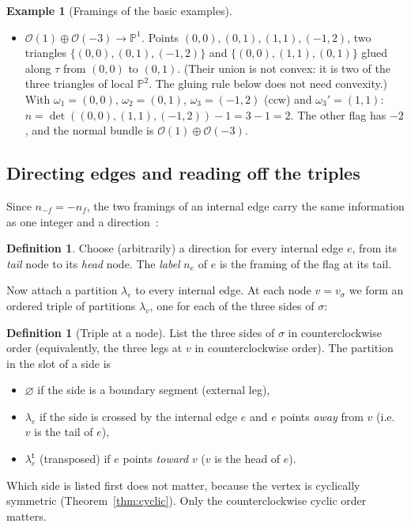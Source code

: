 \documentclass[11pt]{article}
\theoremstyle{plain}
\theoremstyle{definition}
\newtheorem{definition}[theorem]{Definition}
\newtheorem{example}[theorem]{Example}
\theoremstyle{remark}
\newcommand{\PP}{\mathbb{P}}
\newcommand{\es}{\varnothing}
\newcommand{\tr}{{\mathsf t}}
\newcommand{\lt}[1]{#1^{\tr}}
\begin{document}
\begin{example}[Framings of the basic examples]
\begin{itemize}
$\omega_0=0$).
The four framings are therefore $0,\pm1,\pm2,\pm1$: a $(-1,-1)$-curve, two $(0,-2)$-curves and a
$(1,-3)$-curve (these are the exceptional curve $B$, two fibers $F$ and the section $B+F$ of the
Hirzebruch surface $F_1$, see Section~\ref{sec:classes}).
\item \textit{$\mathcal O(1)\oplus\mathcal O(-3)\rightarrow\PP^1$.} Points $(0,0),(0,1),(1,1),(-1,2)$, two
triangles $\{(0,0),(0,1),(-1,2)\}$ and $\{(0,0),(1,1),(0,1)\}$ glued along $\tau$ from $(0,0)$ to
$(0,1)$. (Their union is not convex: it is two of the three triangles of local $\PP^2$. The
gluing rule below does not need convexity.) With $\omega_1=(0,0)$, $\omega_2=(0,1)$,
$\omega_3=(-1,2)$ (ccw) and $\omega_3'=(1,1)$: $n=\det((0,0),(1,1),(-1,2))-1=3-1=2$. The other
flag has $-2$, and the normal bundle is $\mathcal O(1)\oplus\mathcal O(-3)$.
\end{itemize}
\end{example}

\subsection{Directing edges and reading off the triples}\label{ssec:triples}

Since $n_{-f}=-n_f$, the two framings of an internal edge carry the same information as one
integer and a direction~\cite[\S2.1]{Kon}:

\begin{definition}
Choose (arbitrarily) a direction for every internal edge $e$, from its \textit{tail} node to its
\textit{head} node. The \textit{label} $n_e$ of $e$ is the framing of the flag at its tail.
\end{definition}

Now attach a partition $\lambda_e$ to every internal edge. At each node $v=v_\sigma$ we form an
ordered triple of partitions $\lambda_v$, one for each of the three sides of $\sigma$:

\begin{definition}[Triple at a node]\label{def:triple}
List the three sides of $\sigma$ in counterclockwise order (equivalently, the three legs at $v$
in counterclockwise order). The partition in the slot of a side is
\begin{itemize}
\item $\es$ if the side is a boundary segment (external leg),
\item $\lambda_e$ if the side is crossed by the internal edge $e$ and $e$ points \textit{away}
from $v$ (i.e.\ $v$ is the tail of $e$),
\item $\lt\lambda_e$ (transposed) if $e$ points \textit{toward} $v$ ($v$ is the head of $e$).
\end{itemize}
Which side is listed first does not matter, because the vertex is cyclically symmetric
(Theorem~\ref{thm:cyclic}). Only the counterclockwise cyclic order matters.
\end{definition}
\end{document}
